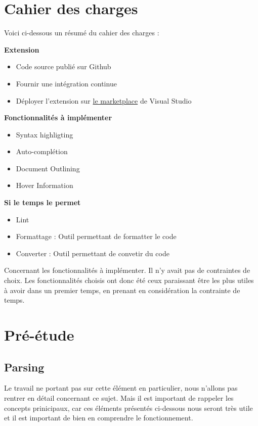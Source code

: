 \documentclass[
    iict, %
    il, %
]{heig-tb}
\begin{document}
\let\cleardoublepage\clearpage

\chapter{Cahier des charges}
Voici ci-dessous un résumé du cahier des charges :

\textbf{Extension}
\begin{itemize}
    \item Code source publié sur Github
    \item Fournir une intégration continue
    \item Déployer l'extension sur \href{https://marketplace.visualstudio.com/}{le marketplace} de Visual Studio
\end{itemize}

\textbf{Fonctionnalités à implémenter}
\begin{itemize}
    \item Syntax highligting
    \item Auto-complétion
    \item Document Outlining
    \item Hover Information
\end{itemize}

\textbf{Si le temps le permet}
\begin{itemize}
    \item Lint
    \item Formattage : Outil permettant de formatter le code
    \item Converter : Outil permettant de convetir du code
\end{itemize}

\vspace{\parskip}

Concernant les fonctionnalités à implémenter. Il n'y avait pas de contraintes de choix.
Les fonctionnalités choisis ont donc été ceux paraissant être les plus utiles à avoir dans un premier temps, en prenant en considération la contrainte de temps.

\chapter{Pré-étude}

\section{Parsing}
Le travail ne portant pas sur cette élément en particulier, nous n'allons pas rentrer en détail concernant ce sujet.
Mais il est important de rappeler les concepts prinicipaux, car ces éléments présentés ci-dessous nous seront très utile et il est important de bien en comprendre le fonctionnement.
\end{document}
